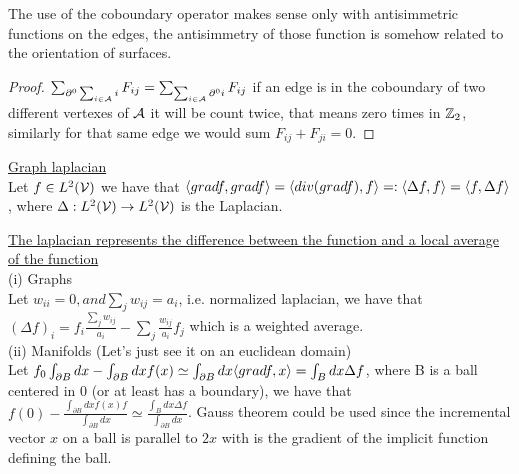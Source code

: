 \documentclass[../main.tex]{subfiles}
\begin{document}
\begin{prop}
    The use of the coboundary operator makes sense only with antisimmetric functions on the edges, the antisimmetry of
    those function is somehow related to the orientation of surfaces.
\end{prop}
\begin{proof}
    $\sum_{\partial^0 \sum_{i \in \mathcal{A}} i}F_{ij} = \sum_{\sum_{i \in \mathcal{A}} \partial^0 i} F_{ij}$ if an edge
    is in the coboundary of two different vertexes of $\mathcal{A}$ it will be count twice, that means zero times in $\mathbb{Z}_2$,
    similarly for that same edge we would sum $F_{ij} + F_{ji} = 0$.
\end{proof}

    
\begin{defn}
    \underline{Graph laplacian}\\
    Let $f \in L^2(\mathcal{V})$ we have that $\langle gradf, gradf \rangle = \langle div(gradf), f \rangle =: \langle \Delta f, f \rangle = \langle f, \Delta f \rangle$, where
    $\Delta : L^2(\mathcal{V}) \to L^2(\mathcal{V})$ is the Laplacian.
\end{defn}

\begin{prop}
    \underline{The laplacian represents the difference between the function and a local average of the function}\\
    (i) Graphs\\
    Let $w_{ii} = 0, and \sum_{j} w_{ij} = a_i$, i.e. normalized laplacian, we have that
    $(\Delta f)_i = f_i\frac{\sum_j w_{ij}}{a_i}-\sum_j\frac{w_{ij}}{a_i}f_j$ which is a weighted average.\\
    (ii) Manifolds (Let's just see it on an euclidean domain)\\
    Let $f_0 \int_{\partial B} dx - \int_{\partial B} dx f(x) \simeq \int_{\partial B} dx \langle grad f, x \rangle = \int_B dx \Delta f$, where 
    B is a ball centered in 0 (or at least has a boundary), we have that $ f(0)-\frac{\int_{\partial B} dx f(x) f}{\int_{\partial B} dx}
    \simeq \frac{\int_B dx \Delta f}{\int_{\partial B} dx}$. Gauss theorem could be used since the incremental vector $x$ on a ball
    is parallel to $2x$ with is the gradient of the implicit function defining the ball.
\end{prop}
\end{document}
